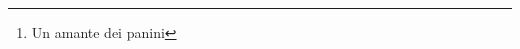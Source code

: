 \documentclass[
	fontsize=10pt, %
	twoside=false, %
	numbers=noenddot, %
]{kaobook}
\begin{document}

\subject{Appunti del corso di\\
Electroweak Interactions}

\title[]{}
\subtitle{Anno accademico 2021-2022\\Corso tenuto dai Proff. Roberto Contino \& Daniele Barducci}

\author{Matteo D'Errigo\thanks{Un amante dei panini}}

\date{\today}



\frontmatter %




\makeatletter
\uppertitleback{\@titlehead} %
\end{document}
